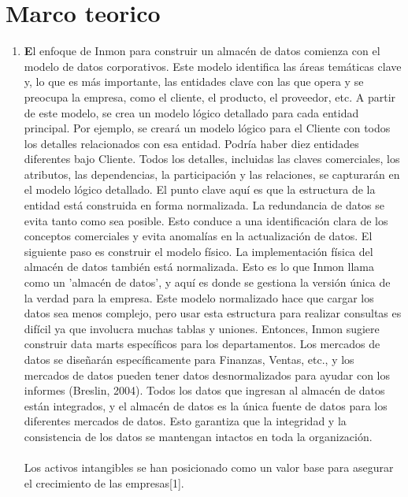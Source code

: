 \documentclass[twoside,twocolumn]{article}
\begin{document}


\section{Marco teorico}
\begin{enumerate}
\item \textbf{E}l enfoque de Inmon para construir un almacén de datos comienza con el modelo de datos corporativos. Este modelo identifica las áreas temáticas clave y, lo que es más importante, las entidades clave con las que opera y se preocupa la empresa, como el cliente, el producto, el proveedor, etc. A partir de este modelo, se crea un modelo lógico detallado para cada entidad principal. Por ejemplo, se creará un modelo lógico para el Cliente con todos los detalles relacionados con esa entidad. Podría haber diez entidades diferentes bajo Cliente. Todos los detalles, incluidas las claves comerciales, los atributos, las dependencias, la participación y las relaciones, se capturarán en el modelo lógico detallado. El punto clave aquí es que la estructura de la entidad está construida en forma normalizada. La redundancia de datos se evita tanto como sea posible. Esto conduce a una identificación clara de los conceptos comerciales y evita anomalías en la actualización de datos. El siguiente paso es construir el modelo físico. La implementación física del almacén de datos también está normalizada. Esto es lo que Inmon llama como un 'almacén de datos', y aquí es donde se gestiona la versión única de la verdad para la empresa. Este modelo normalizado hace que cargar los datos sea menos complejo, pero usar esta estructura para realizar consultas es difícil ya que involucra muchas tablas y uniones. Entonces, Inmon sugiere construir data marts específicos para los departamentos. Los mercados de datos se diseñarán específicamente para Finanzas, Ventas, etc., y los mercados de datos pueden tener datos desnormalizados para ayudar con los informes (Breslin, 2004). Todos los datos que ingresan al almacén de datos están integrados, y el almacén de datos es la única fuente de datos para los diferentes mercados de datos. Esto garantiza que la integridad y la consistencia de los datos se mantengan intactos en toda la organización.\\ \\
Los activos intangibles se han posicionado como un valor base para asegurar el crecimiento de las empresas[1].


\end{enumerate}
\end{document}

